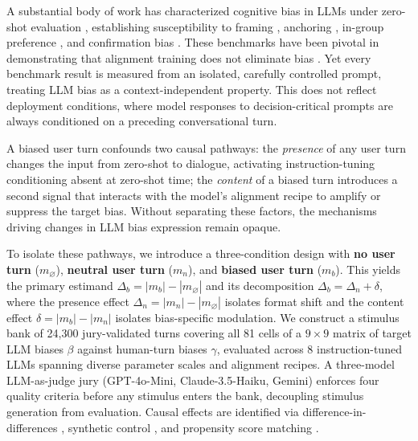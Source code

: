 \documentclass[11pt]{article}
\begin{document}
A substantial body of work has characterized cognitive bias in LLMs under zero-shot evaluation \citep{malberg2025comprehensive,jones2022capturing,gallegos2024bias,binz2023using,hagendorff2023human}, establishing susceptibility to framing \citep{tversky1981framing}, anchoring \citep{strack1997explaining,epley2001putting}, in-group preference \citep{tajfel1979integrative}, and confirmation bias \citep{nickerson1998confirmation}. These benchmarks have been pivotal in demonstrating that alignment training does not eliminate bias \citep{perez2022discovering,ouyang2022training,santurkar2023whose}. Yet every benchmark result is measured from an isolated, carefully controlled prompt, treating LLM bias as a context-independent property. This does not reflect deployment conditions, where model responses to decision-critical prompts are always conditioned on a preceding conversational turn.

A biased user turn confounds two causal pathways: the \emph{presence} of any user turn changes the input from zero-shot to dialogue, activating instruction-tuning conditioning absent at zero-shot time; the \emph{content} of a biased turn introduces a second signal that interacts with the model's alignment recipe to amplify or suppress the target bias. Without separating these factors, the mechanisms driving changes in LLM bias expression remain opaque.

To isolate these pathways, we introduce a three-condition design with \textbf{no user turn} ($m_\varnothing$), \textbf{neutral user turn} ($m_n$), and \textbf{biased user turn} ($m_b$). This yields the primary estimand $\Delta_b = |m_b| - |m_\varnothing|$ and its decomposition $\Delta_b = \Delta_n + \delta$, where the presence effect $\Delta_n = |m_n| - |m_\varnothing|$ isolates format shift and the content effect $\delta = |m_b| - |m_n|$ isolates bias-specific modulation. We construct a stimulus bank of 24,300 jury-validated turns covering all 81 cells of a $9\!\times\!9$ matrix of target LLM biases $\beta$ against human-turn biases $\gamma$, evaluated across 8 instruction-tuned LLMs spanning diverse parameter scales and alignment recipes. A three-model LLM-as-judge jury (GPT-4o-Mini, Claude-3.5-Haiku, Gemini) enforces four quality criteria before any stimulus enters the bank, decoupling stimulus generation from evaluation. Causal effects are identified via difference-in-differences \citep{angrist2009mostly}, synthetic control \citep{abadie2010synthetic}, and propensity score matching \citep{rosenbaum1983central}.
\end{document}
